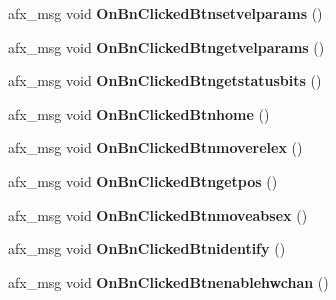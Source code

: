 \begin{DoxyCompactItemize}
\item 
afx\+\_\+msg void {\bfseries On\+Bn\+Clicked\+Btnsetvelparams} ()\hypertarget{class_c_a_p_t_d_l_l_client_dlg_ac6ceed30e28060c921df09be71c4f682}{}\label{class_c_a_p_t_d_l_l_client_dlg_ac6ceed30e28060c921df09be71c4f682}

\item 
afx\+\_\+msg void {\bfseries On\+Bn\+Clicked\+Btngetvelparams} ()\hypertarget{class_c_a_p_t_d_l_l_client_dlg_aa68ac7728840684969b81d83ec03202f}{}\label{class_c_a_p_t_d_l_l_client_dlg_aa68ac7728840684969b81d83ec03202f}

\item 
afx\+\_\+msg void {\bfseries On\+Bn\+Clicked\+Btngetstatusbits} ()\hypertarget{class_c_a_p_t_d_l_l_client_dlg_a44a391db1e9e78677ba8d951051e7d7e}{}\label{class_c_a_p_t_d_l_l_client_dlg_a44a391db1e9e78677ba8d951051e7d7e}

\item 
afx\+\_\+msg void {\bfseries On\+Bn\+Clicked\+Btnhome} ()\hypertarget{class_c_a_p_t_d_l_l_client_dlg_a38a20eebafa8178d2154988f118fdc9b}{}\label{class_c_a_p_t_d_l_l_client_dlg_a38a20eebafa8178d2154988f118fdc9b}

\item 
afx\+\_\+msg void {\bfseries On\+Bn\+Clicked\+Btnmoverelex} ()\hypertarget{class_c_a_p_t_d_l_l_client_dlg_a056099dc167e09346b785aa8e80d712f}{}\label{class_c_a_p_t_d_l_l_client_dlg_a056099dc167e09346b785aa8e80d712f}

\item 
afx\+\_\+msg void {\bfseries On\+Bn\+Clicked\+Btngetpos} ()\hypertarget{class_c_a_p_t_d_l_l_client_dlg_a6a166ed9d9af28c4ea8429c0ab1a451f}{}\label{class_c_a_p_t_d_l_l_client_dlg_a6a166ed9d9af28c4ea8429c0ab1a451f}

\item 
afx\+\_\+msg void {\bfseries On\+Bn\+Clicked\+Btnmoveabsex} ()\hypertarget{class_c_a_p_t_d_l_l_client_dlg_a4514586e5569e0e99507c3777bc2cd7d}{}\label{class_c_a_p_t_d_l_l_client_dlg_a4514586e5569e0e99507c3777bc2cd7d}

\item 
afx\+\_\+msg void {\bfseries On\+Bn\+Clicked\+Btnidentify} ()\hypertarget{class_c_a_p_t_d_l_l_client_dlg_a2cb4573f4902a125d19eda2bd00b7185}{}\label{class_c_a_p_t_d_l_l_client_dlg_a2cb4573f4902a125d19eda2bd00b7185}

\item 
afx\+\_\+msg void {\bfseries On\+Bn\+Clicked\+Btnenablehwchan} ()\hypertarget{class_c_a_p_t_d_l_l_client_dlg_a876ad07e6838e9d5335f75cf5c31759b}{}\label{class_c_a_p_t_d_l_l_client_dlg_a876ad07e6838e9d5335f75cf5c31759b}


\end{DoxyCompactItemize}
